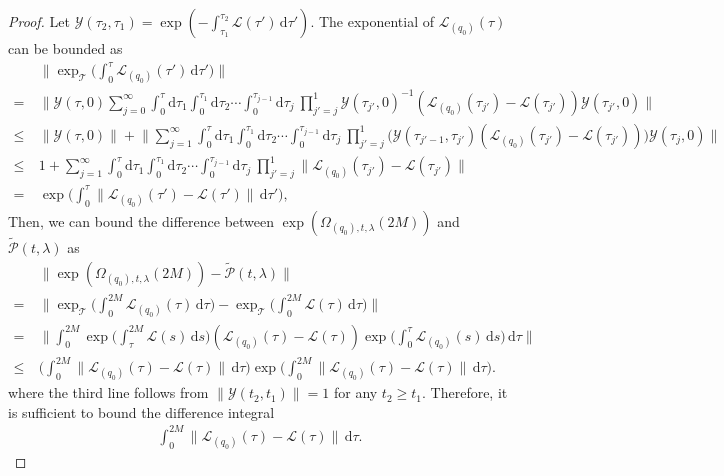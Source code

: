 \documentclass[11pt]{article}
\renewcommand{\d}{\mathrm{d}}
\newcommand{\mc}{\mathcal}
\begin{document}
\begin{proof}
Let $\mc Y(\tau_2, \tau_1) = \exp(-\int_{\tau_1}^{\tau_2}\mc L(\tau')\,\d \tau' )$.
The exponential of $\mc L_{(q_0)}(\tau)$ can be bounded as \begin{align*}
    &\bigg\|\exp_{\mc T}\bigg(\int_{0}^{\tau} \mc L_{(q_0)}(\tau')\,\d \tau'\bigg)\bigg\|  \\
    =~&\bigg\|\mc Y(\tau,0)\sum_{j=0}^{\infty}\int_{0}^{\tau}\d \tau_1\int_0^{\tau_1}\d \tau_2 \cdots \int_{0}^{\tau_{j-1}}\d \tau_j~\prod_{j'=j}^{1}\mc Y(\tau_{j'},0)^{-1}(\mc L_{(q_0)}(\tau_{j'})-\mc L(\tau_{j'}))\mc Y(\tau_{j'},0)\bigg\| \\
    \le ~& \|\mc Y(\tau,0)\|+\bigg\|\sum_{j=1}^{\infty}\int_{0}^{\tau}\d \tau_1\int_0^{\tau_1}\d \tau_2 \cdots \int_{0}^{\tau_{j-1}}\d \tau_j~\prod_{j'=j}^{1}\Big(\mc Y(\tau_{j'-1},\tau_{j'})(\mc L_{(q_0)}(\tau_{j'})-\mc L(\tau_{j'}))\Big)\mc Y(\tau_j,0)\bigg\|\\
    \le ~&1+\sum_{j=1}^{\infty}\int_{0}^{\tau}\d \tau_1\int_0^{\tau_1}\d \tau_2 \cdots \int_{0}^{\tau_{j-1}}\d \tau_j~\prod_{j'=j}^{1}\| \mc L_{(q_0)}(\tau_{j'})-\mc L(\tau_{j'})\|\\
    =~& \exp\bigg(\int_{0}^{\tau}\| \mc L_{(q_0)}(\tau')-\mc L(\tau')\|\,\d \tau'\bigg),
\end{align*}
Then, we can bound the difference between $\exp(\Omega_{(q_0), t,\lambda}(2M))$ and $\tilde{\mc P}(t,\lambda)$ as
\begin{align*}
    &\|\exp(\Omega_{(q_0), t,\lambda}(2M))-\tilde{\mc P}(t,\lambda)\|\\
    =~&\bigg\|\exp_{\mc T}\bigg(\int_{0}^{2M} \mc L_{(q_0)}(\tau)\,\d \tau\bigg)-\exp_{\mc T}\bigg(\int_{0}^{2M} \mc L(\tau)\,\d \tau\bigg)\bigg\| \\
    =~&\bigg\|\int_{0}^{2M} \exp\bigg(\int_{\tau}^{2M} \mc L(s)\,\d s\bigg)(\mc L_{(q_0)}(\tau)-\mc L(\tau)) \exp\bigg(\int_{0}^\tau \mc L_{(q_0)}(s)\,\d s\bigg)\,\d \tau\bigg\| \\
    \le~&\bigg( \int_{0}^{2M}\| \mc L_{(q_0)}(\tau)-\mc L(\tau)\|\,\d \tau\bigg)\exp\bigg(\int_{0}^{2M}\| \mc L_{(q_0)}(\tau)-\mc L(\tau)\|\,\d \tau\bigg).
\end{align*}
where the third line follows from $\|\mc Y(t_2, t_1)\|=1$ for any $t_2 \ge t_1$. Therefore, it is sufficient to bound the difference integral \begin{align*}
    \int_{0}^{2M}\| \mc L_{(q_0)}(\tau)-\mc L(\tau)\|\,\d \tau.
\end{align*}



\end{proof}
\end{document}
